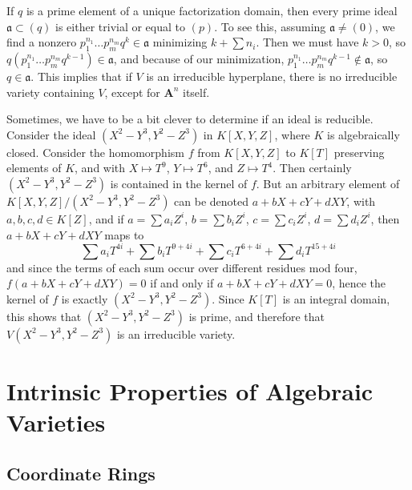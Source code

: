 \begin{example}
    If $q$ is a prime element of a unique factorization domain, then every prime ideal $\mathfrak{a} \subset (q)$ is either trivial or equal to $(p)$. To see this, assuming $\mathfrak{a} \neq (0)$, we find a nonzero $p_1^{n_1} \dots p_m^{n_m} q^k \in \mathfrak{a}$ minimizing $k + \sum n_i$. Then we must have $k > 0$, so $q(p_1^{n_1} \dots p_m^{n_m} q^{k-1}) \in \mathfrak{a}$, and because of our minimization, $p_1^{n_1} \dots p_m^{n_m} q^{k-1} \not \in \mathfrak{a}$, so $q \in \mathfrak{a}$. This implies that if $V$ is an irreducible hyperplane, there is no irreducible variety containing $V$, except for $\mathbf{A}^n$ itself.
\end{example}

\begin{example}
    Sometimes, we have to be a bit clever to determine if an ideal is reducible. Consider the ideal $(X^2 - Y^3,Y^2 - Z^3)$ in $K[X,Y,Z]$, where $K$ is algebraically closed. Consider the homomorphism $f$ from $K[X,Y,Z]$ to $K[T]$ preserving elements of $K$, and with $X \mapsto T^9$, $Y \mapsto T^6$, and $Z \mapsto T^4$. Then certainly $(X^2 - Y^3, Y^2 - Z^3)$ is contained in the kernel of $f$. But an arbitrary element of $K[X,Y,Z]/(X^2 - Y^3, Y^2 - Z^3)$ can be denoted $a + bX + cY + dXY$, with $a,b,c,d \in K[Z]$, and if $a = \sum a_i Z^i$, $b = \sum b_i Z^i$, $c = \sum c_i Z^i$, $d = \sum d_iZ^i$, then $a + bX + cY + dXY$ maps to
    \[ \sum a_i T^{4i} + \sum b_i T^{9 + 4i} + \sum c_i T^{6 + 4i} + \sum d_i T^{15 + 4i} \]
    and since the terms of each sum occur over different residues mod four, $f(a + bX + cY + dXY) = 0$ if and only if $a + bX + cY + dXY = 0$, hence the kernel of $f$ is exactly $(X^2 - Y^3, Y^2 - Z^3)$. Since $K[T]$ is an integral domain, this shows that $(X^2 - Y^3, Y^2 - Z^3)$ is prime, and therefore that $V(X^2 - Y^3, Y^2 - Z^3)$ is an irreducible variety.
\end{example}


\chapter{Intrinsic Properties of Algebraic Varieties}

\section{Coordinate Rings}

